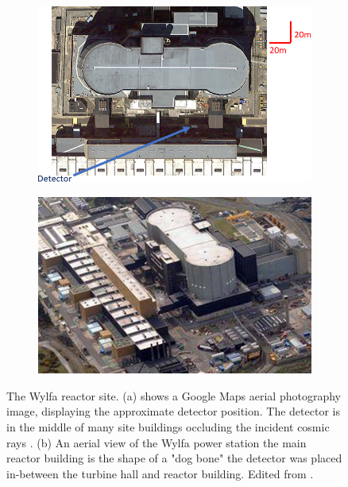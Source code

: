 \begin{figure}[!h]
\centering
\begin{subfigure}{.5\textwidth}
  \centering
  \includegraphics[width=\linewidth]{Chapter5/Figs/wylfaRasterNew/DetectorPositionTopDown.png}
  \captionsetup{width=.9\linewidth}
  \caption{}
  \label{subFig:DetectorPositionTopDown}
\end{subfigure}%
\begin{subfigure}{.5\textwidth}
  \centering
\includegraphics[width=\linewidth]{Chapter5/Figs/Raster/wylfaArielView.png}
  \captionsetup{width=.9\linewidth}
  \caption{}
  \label{subFig:wylfaArielView}
\end{subfigure}
\caption{The Wylfa reactor site. (a) shows a Google Maps aerial photography image, displaying the approximate detector position. The detector is in the middle of many site buildings occluding the incident cosmic rays \cite{GoogleMapsWylfaLink}. (b) An aerial view of the Wylfa power station the main reactor building is the shape of a "dog bone" the detector was placed in-between the turbine hall and reactor building. Edited from \cite{wylfaDronePictureLink}.}
\label{fig:DetectorPosition_TopDownAndAriel}
\end{figure}

